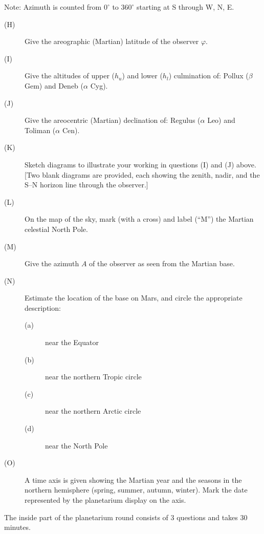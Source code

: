 Note: Azimuth is counted from $0^\circ$ to $360^\circ$ starting at S through
W, N, E.

\begin{description}
\item[(H)] Give the areographic (Martian) latitude of the observer
  $\varphi$.
\item[(I)] Give the altitudes of upper ($h_u$) and lower ($h_l$) culmination
  of:
  Pollux ($\beta$ Gem) and Deneb ($\alpha$ Cyg).
\item[(J)] Give the areocentric (Martian) declination of:
  Regulus ($\alpha$ Leo) and Toliman ($\alpha$ Cen).
\item[(K)] Sketch diagrams to illustrate your working in questions (I) and
  (J) above.
  [Two blank diagrams are provided, each showing the zenith, nadir, and the
  S--N horizon line through the observer.]
\item[(L)] On the map of the sky, mark (with a cross) and label (``M'') the
  Martian celestial North Pole.
\item[(M)] Give the azimuth $A$ of the observer as seen from the Martian
  base.
\item[(N)] Estimate the location of the base on Mars, and circle the
  appropriate description:
  \begin{description}
  \item[(a)] near the Equator
  \item[(b)] near the northern Tropic circle
  \item[(c)] near the northern Arctic circle
  \item[(d)] near the North Pole
  \end{description}
\item[(O)] A time axis is given showing the Martian year and the seasons in
  the northern hemisphere (spring, summer, autumn, winter). Mark the date
  represented by the planetarium display on the axis.
\end{description}


The inside part of the planetarium round consists of 3 questions and takes
30 minutes.


